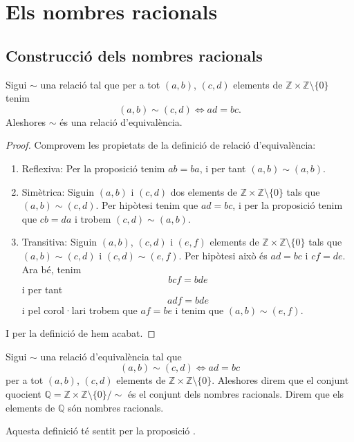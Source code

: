 \documentclass[../Apunts.tex]{subfiles}
\begin{document}
	\section{Els nombres racionals}
	\subsection{Construcció dels nombres racionals}
	\begin{proposition}
		\label{prop:nombres racionals}
		Sigui \(\sim\) una relació tal que per a tot \((a,b)\), \((c,d)\) elements de \(\mathbb{Z}\times\mathbb{Z}\setminus\{0\}\) tenim
		\[(a,b)\sim(c,d)\Longleftrightarrow ad=bc.\]
		Aleshores \(\sim\) és una relació d'equivalència.
		\begin{proof}
			Comprovem les propietats de la definició de relació d'equivalència:
			\begin{enumerate}
				\item Reflexiva: Per la proposició  tenim \(ab=ba\), i per tant \((a,b)\sim(a,b)\).
				\item Simètrica: Siguin \((a,b)\) i \((c,d)\) dos elements de \(\mathbb{Z}\times\mathbb{Z}\setminus\{0\}\) tals que \((a,b)\sim(c,d)\). Per hipòtesi tenim que \(ad=bc\), i per la proposició  tenim que \(cb=da\) i trobem \((c,d)\sim(a,b)\).
				\item Transitiva:  Siguin \((a,b)\), \((c,d)\) i \((e,f)\) elements de \(\mathbb{Z}\times\mathbb{Z}\setminus\{0\}\) tals que \((a,b)\sim(c,d)\) i \((c,d)\sim(e,f)\). Per hipòtesi això és \(ad=bc\) i \(cf=de\). Ara bé, tenim
				\[bcf=bde\]
				i per tant
				\[adf=bde\]
				i pel corol·lari  trobem que \(af=be\) i tenim que \((a,b)\sim(e,f)\).
			\end{enumerate}
			I per la definició de  hem acabat.
		\end{proof}
	\end{proposition}
	\begin{definition}
		\label{def:nombres racionals}
		Sigui \(\sim\) una relació d'equivalència tal que
		\[(a,b)\sim(c,d)\Longleftrightarrow ad=bc\]
		per a tot \((a,b)\), \((c,d)\) elements de \(\mathbb{Z}\times\mathbb{Z}\setminus\{0\}\).
		Aleshores direm que el conjunt quocient \(\mathbb{Q}=\mathbb{Z}\times\mathbb{Z}\setminus\{0\}/\sim\) és el conjunt dels nombres racionals. Direm que els elements de \(\mathbb{Q}\) són nombres racionals.
		
		Aquesta definició té sentit per la proposició .
	\end{definition}
\end{document}
